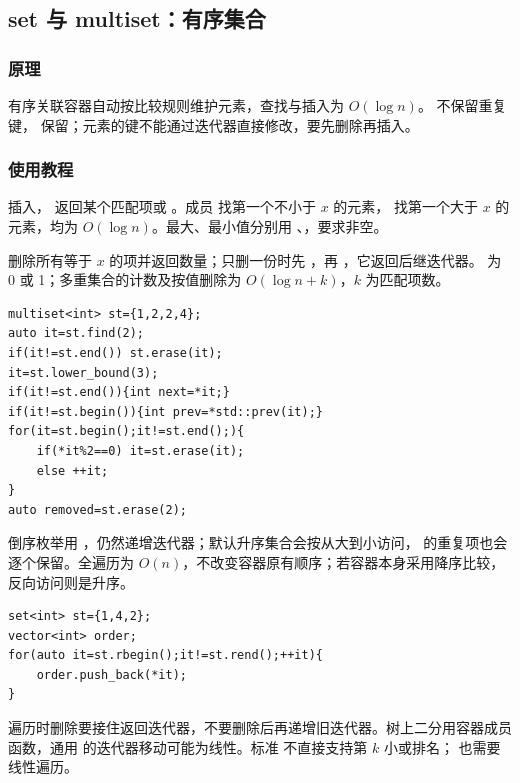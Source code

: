\subsection{set 与 multiset：有序集合}
\label{stl:set}
\subsubsection*{原理}
有序关联容器自动按比较规则维护元素，查找与插入为 $O(\log n)$。 不保留重复键， 保留；元素的键不能通过迭代器直接修改，要先删除再插入。
\subsubsection*{使用教程}
 插入， 返回某个匹配项或 。成员  找第一个不小于 $x$ 的元素， 找第一个大于 $x$ 的元素，均为 $O(\log n)$。最大、最小值分别用 、，要求非空。

 删除所有等于 $x$ 的项并返回数量；只删一份时先 ，再 ，它返回后继迭代器。 为 0 或 1；多重集合的计数及按值删除为 $O(\log n+k)$，$k$ 为匹配项数。
\begin{lstlisting}[style=mtycpp,numbers=none]
multiset<int> st={1,2,2,4};
auto it=st.find(2);
if(it!=st.end()) st.erase(it);
it=st.lower_bound(3);
if(it!=st.end()){int next=*it;}
if(it!=st.begin()){int prev=*std::prev(it);}
for(it=st.begin();it!=st.end();){
	if(*it%2==0) it=st.erase(it);
	else ++it;
}
auto removed=st.erase(2);
\end{lstlisting}
倒序枚举用 ，仍然递增迭代器；默认升序集合会按从大到小访问， 的重复项也会逐个保留。全遍历为 $O(n)$，不改变容器原有顺序；若容器本身采用降序比较，反向访问则是升序。
\begin{lstlisting}[style=mtycpp,numbers=none]
set<int> st={1,4,2};
vector<int> order;
for(auto it=st.rbegin();it!=st.rend();++it){
	order.push_back(*it);
}
\end{lstlisting}
遍历时删除要接住返回迭代器，不要删除后再递增旧迭代器。树上二分用容器成员函数，通用  的迭代器移动可能为线性。标准  不直接支持第 $k$ 小或排名； 也需要线性遍历。
